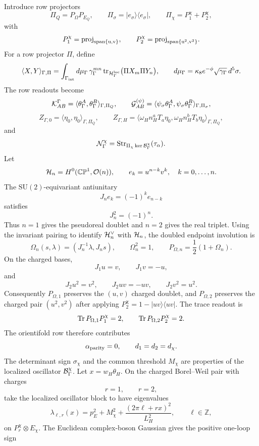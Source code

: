 \documentclass[11pt]{article}
\theoremstyle{definition}
\theoremstyle{remark}
\newcommand{\SU}{\mathrm{SU}}
\newcommand{\CP}{\mathbb{CP}}
\begin{document}
Introduce row projectors
\[
  \Pi_Q=P_\Omega P_{E_Q},
  \qquad
  \Pi_\sigma=|e_\sigma\rangle\langle e_\sigma|,
  \qquad
  \Pi_\chi=P_1^\chi+P_2^\chi ,
\]
with
\[
  P_1^\chi={\rm proj}_{\rm span\{u,v\}},
  \qquad
  P_2^\chi={\rm proj}_{\rm span\{u^2,v^2\}} .
\]
For a row projector \(\Pi\), define
\[
  \langle X,Y\rangle_{\Gamma,\Pi}
  =
  \int_{\Gamma_{\rm int}}d\mu_\Gamma\,
  \gamma_\Gamma^{mn}\,
  {\rm tr}_{{\cal H}_\Gamma^{\rm loc}}
  \bigl(\Pi X_m\Pi Y_n\bigr),
  \qquad
  d\mu_\Gamma=\kappa_8e^{-\phi}\sqrt{\gamma_\Gamma}\,d^5\sigma .
\]
The row readouts become
\[
  {\cal K}_{AB}^\Gamma
  =
  \langle\theta_\Gamma^A,\theta_\Gamma^B\rangle_{\Gamma,\Pi_Q},
  \qquad
  {\cal G}_{AB}^{(\psi)}
  =
  \langle\psi_\sigma\theta_\Gamma^A,
  \psi_\sigma\theta_\Gamma^B\rangle_{\Gamma,\Pi_\sigma},
\]
\[
  Z_{\Gamma,0}=\langle\eta_0,\eta_0\rangle_{\Gamma,\Pi_Q},
  \qquad
  Z_{\Gamma,H}
  =
  \langle\omega_H n_H^aT_a\eta_0,
  \omega_H n_H^bT_b\eta_0\rangle_{\Gamma,\Pi_Q},
\]
and
\[
  {\cal N}_\Gamma^\chi
  =
  {\rm Str}_{\Pi_\chi\ker{\cal B}_\Gamma^\chi}
  (\tau_\alpha).
\]
Let
\[
  {\cal H}_n=H^0(\CP^1,\mathcal O(n)),
  \qquad
  e_k=u^{n-k}v^k,\quad k=0,\ldots,n .
\]
The \(\SU(2)\)-equivariant antiunitary
\[
  J_n e_k=(-1)^k e_{n-k}
\]
satisfies
\[
  J_n^2=(-1)^n .
\]
Thus \(n=1\) gives the pseudoreal doublet and \(n=2\) gives the real triplet.
Using the invariant pairing to identify \({\cal H}_n^\vee\) with
\({\cal H}_n\), the doubled endpoint involution is
\[
  \Omega_n(s,\lambda)=(J_n^{-1}\lambda,J_ns),
  \qquad
  \Omega_n^2=1,
  \qquad
  P_{\Omega,n}=\frac12(1+\Omega_n).
\]
On the charged bases,
\[
  J_1u=v,\qquad J_1v=-u,
\]
and
\[
  J_2u^2=v^2,\qquad J_2uv=-uv,\qquad J_2v^2=u^2 .
\]
Consequently \(P_{\Omega,1}\) preserves the \((u,v)\) charged doublet, and
\(P_{\Omega,2}\) preserves the charged pair \((u^2,v^2)\) after applying
\(P_2^\chi=1-|uv\rangle\langle uv|\).  The trace readout is
\[
  {\rm Tr}\,P_{\Omega,1}P_1^\chi=2,
  \qquad
  {\rm Tr}\,P_{\Omega,2}P_2^\chi=2 .
\]
The orientifold row therefore contributes
\[
  \alpha_{\rm parity}=0,
  \qquad
  d_1=d_2=d_\chi .
\]
The determinant sign \(\sigma_\chi\) and the common threshold \(M_\chi\) are
properties of the localized oscillator \({\cal B}_\Gamma^\chi\).
Let \(x=w_H\theta_H\).  On the charged Borel--Weil pair with charges
\[
  r=1,\qquad r=2 ,
\]
take the localized oscillator block to have eigenvalues
\[
  \lambda_{\ell,r}(x)
  =
  p_E^2+M_\chi^2+
  \frac{(2\pi\ell+r x)^2}{L_H^2},
  \qquad
  \ell\in\mathbb Z,
\]
on \(P_r^\chi\otimes E_\chi\).  The Euclidean complex-boson Gaussian gives
the positive one-loop sign
\end{document}
